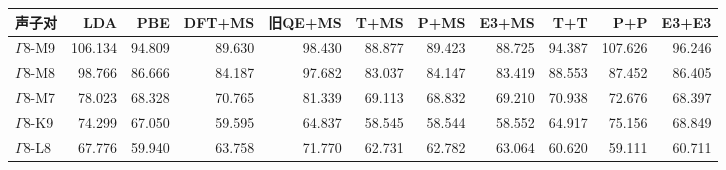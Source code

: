 \begin{tabular}{lrrrrrrrrrr}
\toprule
声子对 & LDA & PBE & DFT+MS & 旧QE+MS & T+MS & P+MS & E3+MS & T+T & P+P & E3+E3 \\
\midrule
$\Gamma$8-M9 & 106.134 & 94.809 & 89.630 & 98.430 & 88.877 & 89.423 & 88.725 & 94.387 & 107.626 & 96.246 \\
$\Gamma$8-M8 & 98.766 & 86.666 & 84.187 & 97.682 & 83.037 & 84.147 & 83.419 & 88.553 & 87.452 & 86.405 \\
$\Gamma$8-M7 & 78.023 & 68.328 & 70.765 & 81.339 & 69.113 & 68.832 & 69.210 & 70.938 & 72.676 & 68.397 \\
$\Gamma$8-K9 & 74.299 & 67.050 & 59.595 & 64.837 & 58.545 & 58.544 & 58.552 & 64.917 & 75.156 & 68.849 \\
$\Gamma$8-L8 & 67.776 & 59.940 & 63.758 & 71.770 & 62.731 & 62.782 & 63.064 & 60.620 & 59.111 & 60.711 \\
\bottomrule
\end{tabular}
